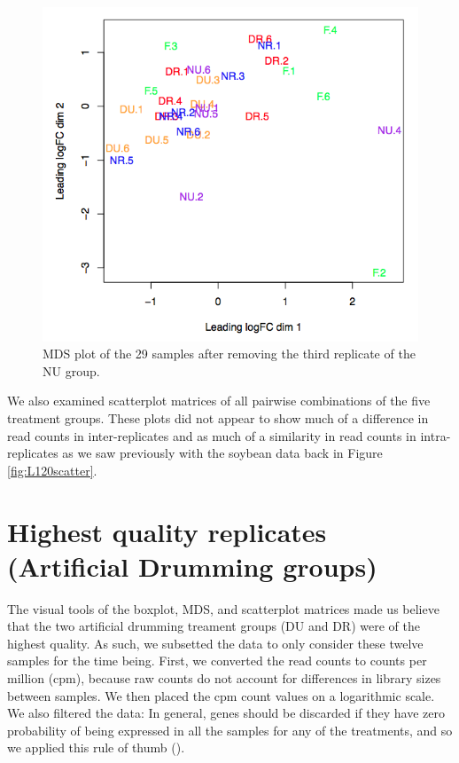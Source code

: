 \documentclass[11pt,a4paper,oldfontcommands,openany]{memoir}
\numberwithin{equation}{section} %
\begin{document}
\begin{figure}[H]
    \begin{framed}
    \centering
    \includegraphics[width=\textwidth]{mdsPW}
    \end{framed}
    \caption{MDS plot of the 29 samples after removing the third replicate of the NU group.}
    \label{fig:mdsPW}
\end{figure}

We also examined scatterplot matrices of all pairwise combinations of the five treatment groups. These plots did not appear to show much of a difference in read counts in inter-replicates and as much of a similarity in read counts in intra-replicates as we saw previously with the soybean data back in Figure \ref{fig:L120scatter}.

\section{Highest quality replicates (Artificial Drumming groups)}

The visual tools of the boxplot, MDS, and scatterplot matrices made us believe that the two artificial drumming treament groups (DU and DR) were of the highest quality. As such, we subsetted the data to only consider these twelve samples for the time being. First, we converted the read counts to counts per million (cpm), because raw counts  do not account for differences in library sizes between samples. We then placed the cpm count values on a logarithmic scale. We also filtered the data: In general, genes should be discarded if they have zero probability of being expressed in all the samples for any of the treatments, and so we applied this rule of thumb (\citealt{edger}).
\end{document}
